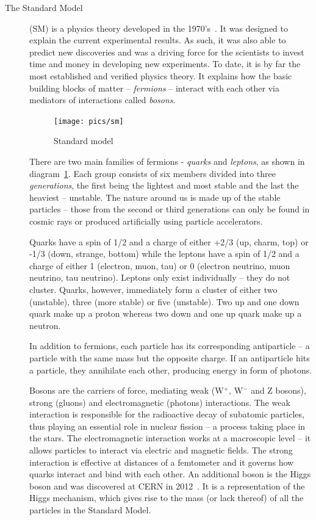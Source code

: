 \documentclass[twoside,12pt]{packages/mytustyle}  %
\begin{document}
\begin{description}
\item[The Standard Model]
(SM) is a physics theory developed in the 1970's~\cite{Novaes:1999yn}. It was designed to explain the current experimental results. As such, it was also able to predict new discoveries and was a driving force for the scientists to invest time and money in developing new experiments. To date, it is by far the most established and verified physics theory. It explains how the basic building blocks of matter -- \emph{fermions} -- interact with each other via mediators of interactions called \emph{bosons}.  
\begin{figure}[!t]
\centering
\texttt{[image: pics/sm]}
\caption{Standard model \cite{Dominguez:2002395}}
\label{fig:sm}
\end{figure}
There are two main families of fermions - \emph{quarks} and \emph{leptons}, as shown in diagram~\ref{fig:sm}. Each group consists of six members divided into three \emph{generations}, the first being the lightest and most stable and the last the heaviest -- unstable. The nature around us is made up of the stable particles -- those from the second or third generations can only be found in cosmic rays or produced artificially using particle accelerators.

Quarks have a spin of 1/2 and a charge of either +2/3 (up, charm, top)  or -1/3  (down, strange, bottom) while the leptons have a spin of 1/2  and a charge of either 1 (electron, muon, tau) or 0 (electron neutrino, muon neutrino, tau neutrino). Leptons only exist individually -- they do not cluster. Quarks, however, immediately form a cluster of either two (unstable), three (more stable) or five (unstable). Two up and one down quark make up a proton whereas two down and one up quark make up a neutron.

In addition to fermions, each particle has its corresponding antiparticle -- a particle with the same mass but the opposite charge. If an antiparticle hits a particle, they annihilate each other, producing energy in form of photons. 

Bosons are the carriers of force, mediating weak (W$^+$, W$^-$ and Z bosons), strong (gluons) and electromagnetic (photons) interactions. The weak interaction is responsible for the radioactive decay of subatomic particles, thus playing an essential role in nuclear fission -- a process taking place in the stars. The electromagnetic interaction works at a macroscopic level -- it allows particles to interact via electric and magnetic fields. The strong interaction is effective at distances of a femtometer and it governs how quarks interact and bind with each other. An additional boson is the Higgs boson and was discovered at CERN in 2012~\cite{}. It is a representation of the Higgs mechanism, which gives rise to the mass (or lack thereof) of all the particles in the Standard Model.
\end{description}
\end{document}

